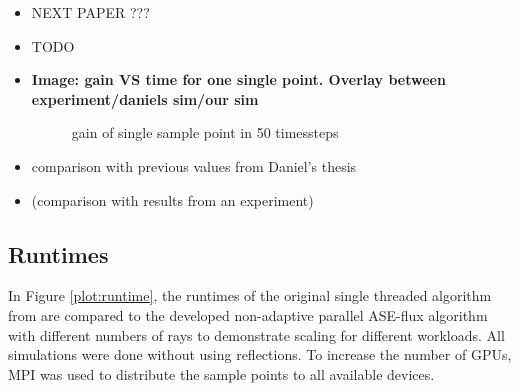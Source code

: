 \begin{itemize}

  \item NEXT PAPER ???
  \item TODO

  \item \textbf{Image: gain VS time for one single point. Overlay between
    experiment/daniels sim/our sim}
    \begin{figure}[H]
      \centerline{
        }
      \caption{gain of single sample point in 50 timessteps}
      \label{plot:benchmark}
    \end{figure}


  \item comparison with previous values from Daniel's thesis

  \item (comparison with results from an experiment)

\end{itemize}


\subsection{Runtimes}
In Figure \ref{plot:runtime}, the runtimes of the original single threaded
algorithm from \cite{ASE2010} are compared to the developed non-adaptive
parallel ASE-flux algorithm with different numbers of rays to demonstrate
scaling for different workloads. All simulations were done without using
reflections. To increase the number of GPUs, MPI\cite{MPI} was used to distribute the
sample points to all available devices. 

